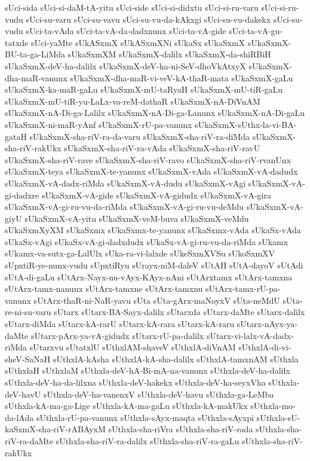{sUci-sida
sUci-si-daM-tA-yitu
sUci-side
sUci-si-didxtu
sUci-si-ru-varu
sUci-si-ru-vudu
sUci-su-varu
sUci-su-vavu
sUci-su-vu-da-kAkxgi
sUci-su-vu-dakekx
sUci-su-vudu
sUci-ta-vAda
sUci-ta-vA-da-dadxnunx
sUci-ta-vA-gide
sUci-ta-vA-gu-tatxde
sUci-yaMte
sUkASxmX
sUkASxmXNi
sUkaSx
sUkaSxmX
sUkaSxmX-BU-ta-ga-LiMda
sUkaSxmXM
sUkaSxmX-dalilx
sUkaSxmX-da-shiRBiH
sUkaSxmX-deV-ha-dalilx
sUkaSxmX-deV-ha-ni-SeV-dhoVkAtxyX
sUkaSxmX-dha-maR-vanunx
sUkaSxmX-dha-maR-vi-veV-kA-thaR-mata
sUkaSxmX-gaLu
sUkaSxmX-ka-maR-gaLu
sUkaSxmX-mU-taRyaH
sUkaSxmX-mU-tiR-gaLu
sUkaSxmX-mU-tiR-yu-LaLx-va-reM-dathaR
sUkaSxmX-nA-DiVnAM
sUkaSxmX-nA-Di-ga-Lalilx
sUkaSxmX-nA-Di-ga-Lanunx
sUkaSxmX-nA-Di-gaLu
sUkaSxmX-ni-maR-yAnf
sUkaSxmX-rU-pa-vanunx
sUkaSxmX-sUthx-la-vi-BA-gataH
sUkaSxmX-sha-riV-ra-da-varu
sUkaSxmX-sha-riV-ra-diMda
sUkaSxmX-sha-riV-rakUkx
sUkaSxmX-sha-riV-ra-vAda
sUkaSxmX-sha-riV-ravU
sUkaSxmX-sha-riV-rave
sUkaSxmX-sha-riV-ravo
sUkaSxmX-sha-riV-rvanUnx
sUkaSxmX-teya
sUkaSxmX-te-yanunx
sUkaSxmX-vAda
sUkaSxmX-vA-dadudx
sUkaSxmX-vA-dadx-riMda
sUkaSxmX-vA-dudu
sUkaSxmX-vAgi
sUkaSxmX-vA-gi-dadxre
sUkaSxmX-vA-gide
sUkaSxmX-vA-gidudx
sUkaSxmX-vA-gira
sUkaSxmX-vA-gi-ru-vu-da-riMda
sUkaSxmX-vA-gi-ru-vu-deMdu
sUkaSxmX-vA-giyU
sUkaSxmX-vA-yitu
sUkaSxmX-veM-buva
sUkaSxmX-veMdu
sUkaSxmXyXM
sUkaSxmx
sUkaSxmx-te-yanunx
sUkaSxmx-vAda
sUkaSx-vAda
sUkaSx-vAgi
sUkaSx-vA-gi-dadxdudx
sUkaSx-vA-gi-ru-vu-da-riMda
sUkamx
sUkamx-va-sutx-ga-LalUlx
sUka-ra-vi-lalxde
sUkeSxmXVSu
sUkoSxmXV
sUpxtiR-ye-nunx-vudu
sUpxtiRyu
sUrayx-niM-daleV
sUtAH
sUtA-dayoV
sUtAdi
sUtA-di-gaLu
sUtArx-Nayx-nu-vAyx-KAyx-nAni
sUtArxtamx
sUtArx-tamxna
sUtArx-tamx-nanunx
sUtArx-tamxne
sUtArx-tamxnu
sUtArx-tamx-rU-pa-vanunx
sUtArx-thaR-ni-NaR-yavu
sUta
sUta-gArx-maNoyxV
sUta-neMdU
sUta-re-ni-su-varu
sUtarx
sUtarx-BA-Sayx-dalilx
sUtarxda
sUtarx-daMte
sUtarx-dalilx
sUtarx-diMda
sUtarx-kA-rarU
sUtarx-kA-rara
sUtarx-kA-raru
sUtarx-nAyx-ya-daMte
sUtarx-pArx-ya-vA-gidudx
sUtarx-rU-pa-dalilx
sUtarx-vi-lalx-vA-dadx-riMda
sUtarxvu
sUtatxlU
sUthxlAM-shaveV
sUthxlA-diVnAM
sUthxlA-di-vi-sheV-SaNaH
sUthxlA-kAsha
sUthxlA-kA-sha-dalilx
sUthxlA-tamxnAM
sUthxla
sUthxlaH
sUthxlaM
sUthxla-deV-hA-Bi-mA-na-vanunx
sUthxla-deV-ha-dalilx
sUthxla-deV-ha-da-lilxna
sUthxla-deV-hakekx
sUthxla-deV-ha-seyxVha
sUthxla-deV-havU
sUthxla-deV-ha-vanenxV
sUthxla-deV-havu
sUthxla-ga-LeMba
sUthxla-kA-ma-ga-Lige
sUthxla-kA-ma-gaLu
sUthxla-kA-makUkx
sUthxla-mo-da-lAda
sUthxla-rU-pa-vanunx
sUthxla-sAyx-maqta
sUthxla-sAyxpi
sUthxla-sU-kaSxmX-sha-riV-rABAyxM
sUthxla-sha-riVra
sUthxla-sha-riV-rada
sUthxla-sha-riV-ra-daMte
sUthxla-sha-riV-ra-dalilx
sUthxla-sha-riV-ra-gaLu
sUthxla-sha-riV-rakUkx
}
